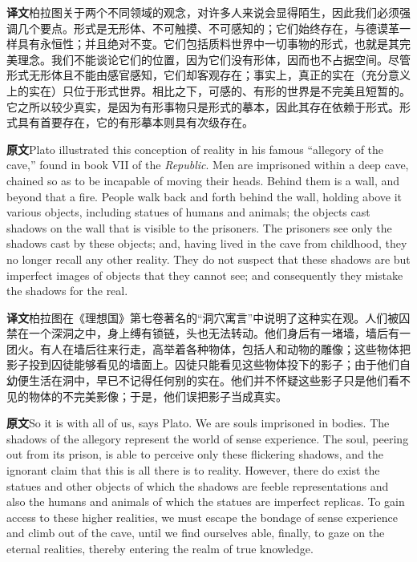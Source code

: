 \documentclass[UTF8,zihao=-4]{ctexart}
\newcommand{\BodyFont}{\fontsize{10.5pt}{15.5pt}\selectfont}
\newcommand{\origlabel}{\textbf{原文}\quad}
\newcommand{\translabel}{\textbf{译文}\quad}
\newcommand{\orig}{\par\noindent\begingroup\BodyFont\origlabel}
\newcommand{\zhline}[1]{\par\endgroup\noindent\begingroup\BodyFont\translabel #1\par\endgroup\vspace{0.35em}}
\begin{document}
\zhline{柏拉图关于两个不同领域的观念，对许多人来说会显得陌生，因此我们必须强调几个要点。形式是无形体、不可触摸、不可感知的；它们始终存在，与德谟革一样具有永恒性；并且绝对不变。它们包括质料世界中一切事物的形式，也就是其完美理念。我们不能谈论它们的位置，因为它们没有形体，因而也不占据空间。尽管形式无形体且不能由感官感知，它们却客观存在；事实上，真正的实在（充分意义上的实在）只位于形式世界。相比之下，可感的、有形的世界是不完美且短暂的。它之所以较少真实，是因为有形事物只是形式的摹本，因此其存在依赖于形式。形式具有首要存在，它的有形摹本则具有次级存在。}

\orig Plato illustrated this conception of reality in his famous ``allegory of the cave,'' found in book VII of the \textit{Republic}. Men are imprisoned within a deep cave, chained so as to be incapable of moving their heads. Behind them is a wall, and beyond that a fire. People walk back and forth behind the wall, holding above it various objects, including statues of humans and animals; the objects cast shadows on the wall that is visible to the prisoners. The prisoners see only the shadows cast by these objects; and, having lived in the cave from childhood, they no longer recall any other reality. They do not suspect that these shadows are but imperfect images of objects that they cannot see; and consequently they mistake the shadows for the real.

\zhline{柏拉图在《理想国》第七卷著名的“洞穴寓言”中说明了这种实在观。人们被囚禁在一个深洞之中，身上缚有锁链，头也无法转动。他们身后有一堵墙，墙后有一团火。有人在墙后往来行走，高举着各种物体，包括人和动物的雕像；这些物体把影子投到囚徒能够看见的墙面上。囚徒只能看见这些物体投下的影子；由于他们自幼便生活在洞中，早已不记得任何别的实在。他们并不怀疑这些影子只是他们看不见的物体的不完美影像；于是，他们误把影子当成真实。}

\orig So it is with all of us, says Plato. We are souls imprisoned in bodies. The shadows of the allegory represent the world of sense experience. The soul, peering out from its prison, is able to perceive only these flickering shadows, and the ignorant claim that this is all there is to reality. However, there do exist the statues and other objects of which the shadows are feeble representations and also the humans and animals of which the statues are imperfect replicas. To gain access to these higher realities, we must escape the bondage of sense experience and climb out of the cave, until we find ourselves able, finally, to gaze on the eternal realities, thereby entering the realm of true knowledge.
\end{document}
